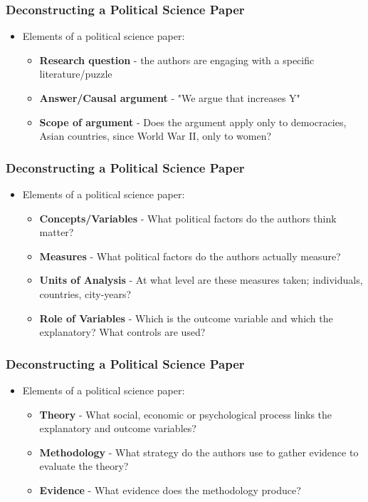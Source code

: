 \documentclass[xcolor=x11names,compress]{beamer}\usepackage[]{graphicx}\usepackage[]{color}
\renewcommand{\(}{\begin{columns}}
\renewcommand{\)}{\end{columns}}
\newcommand{\<}[1]{\begin{column}{#1}}
\renewcommand{\>}{\end{column}}
\begin{document}
\begin{frame}
\frametitle{Deconstructing a Political Science Paper}
\begin{itemize}
\item Elements of a political science paper:
\begin{itemize}
\item \textbf{Research question} - the authors are engaging with a specific literature/puzzle
\item \textbf{Answer/Causal argument} - "We argue that  increases Y"
\item \textbf{Scope of argument} - Does the argument apply only to democracies, Asian countries, since World War II, only to women?
\end{itemize}
\end{itemize}
\end{frame}

\begin{frame}
\frametitle{Deconstructing a Political Science Paper}
\begin{itemize}
\item Elements of a political science paper:
\begin{itemize}
\item \textbf{Concepts/Variables} - What political factors do the authors think matter?
\item \textbf{Measures} - What political factors do the authors actually measure?
\item \textbf{Units of Analysis} - At what level are these measures taken; individuals, countries, city-years?
\item \textbf{Role of Variables} - Which is the outcome variable and which the explanatory? What controls are used?
\end{itemize}
\end{itemize}
\end{frame}

\begin{frame}
\frametitle{Deconstructing a Political Science Paper}
\begin{itemize}
\item Elements of a political science paper:
\begin{itemize}
\item \textbf{Theory} - What social, economic or psychological process links the explanatory and outcome variables? 
\item \textbf{Methodology} - What strategy do the authors use to gather evidence to evaluate the theory?
\item \textbf{Evidence} - What evidence does the methodology produce?
\end{itemize}
\end{itemize}
\end{frame}
\end{document}
